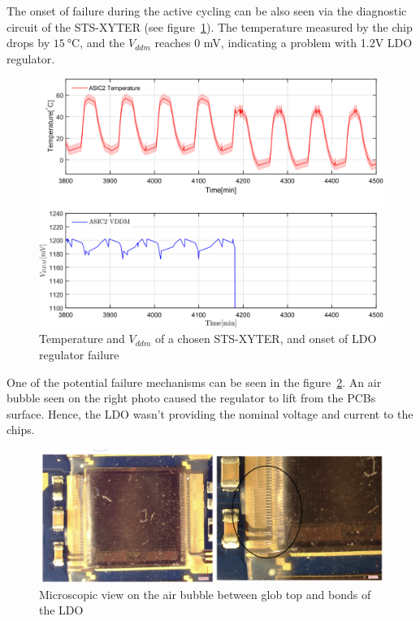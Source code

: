 The onset of failure during the active cycling can be also seen via the diagnostic circuit of the \gls{STS}-XYTER (see figure~\ref{fig_active_failure}). The temperature measured by the chip drops by $\SI{15}{\celsius}$, and the $V_{ddm}$ reaches 0 mV, indicating a problem with 1.2V \gls{LDO} regulator. 

\begin{figure}[!h]
\centering
\includegraphics[width=0.6\columnwidth]{Chapter3/Cycling/Images/FEB2ASIC2COMP1.png}
\caption{Temperature and $V_{ddm}$ of a chosen \gls{STS}-XYTER, and onset of \gls{LDO} regulator failure}
\label{fig_active_failure}
\end{figure}

One of the potential failure mechanisms can be seen in the figure~\ref{fig_ldo_lift}. An air bubble seen on the right photo caused the regulator to lift from the \glspl{PCB} surface. Hence, the \gls{LDO} wasn't providing the nominal voltage and current to the chips. 

\begin{figure}[!h]
\centering
\includegraphics[width=0.8\columnwidth]{Chapter3/Cycling/Images/FEB_81_LDO_lift.png}
\caption{Microscopic view on the air bubble between glob top and bonds of the \gls{LDO}}
\label{fig_ldo_lift}
\end{figure}
\newpage
